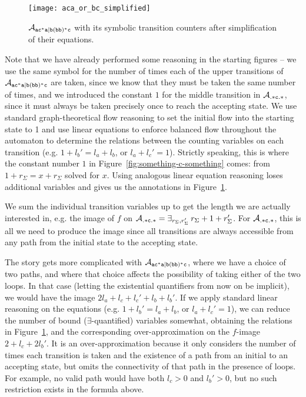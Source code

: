 \documentclass[acmsmall,review,anonymous,screen]{acmart}\settopmatter{printfolios=true,printccs=false,printacmref=true}
\theoremstyle{definition}
\begin{document}
\begin{figure}[h]
  \centering 
    \texttt{[image: aca\_or\_bc\_simplified]}
    \caption{$\mathcal{A}_{\mathtt{ac^*a|b(bb)^*c}}{}$ with its symbolic transition counters after
    simplification of their equations.}\label{fig:example-simplify-1}
  \end{figure}

Note that we have already performed some reasoning in the starting figures -- we
use the same symbol for the number of times each of the upper transitions of
$\mathcal{A}_{\mathtt{ac^*a|b(bb)^*c}}$ are taken, since we know that they must be taken the same number of
times, and we introduced the constant $1$ for the middle transition in
$\mathcal{A}_{\mathtt{.*c.*}}$, since it must always be taken precisely once to reach
the accepting state. We use standard graph-theoretical flow reasoning to set the
initial flow into the starting state to 1 and use linear equations to enforce
balanced flow throughout the automaton to determine the relations between the
counting variables on each transition (e.g. $1 + {l_b}' = l_a + l_b$, or $l_a +
l_c' = 1$). Strictly speaking, this is where the constant number $1$ in
Figure~\ref{fig:something-c-something} comes: from $1 + r_\Sigma = x + r_\Sigma$
solved for $x$. Using analogous linear equation reasoning loses additional
variables and gives us the annotations in Figure~\ref{fig:example-simplify-1}. 

We sum the individual transition variables up to get the length we are actually
interested in, e.g. the image of $f$ on $\mathcal{A}_{\mathtt{.*c.*}} =
\exists_{r_\Sigma, r_\Sigma'} \: r_\Sigma + 1 + r_\Sigma'$. For
$\mathcal{A}_{\mathtt{.*c.*}}{}$, this is all we need to produce the image since all
transitions are always accessible from any path from the initial state to the
accepting state.

The story gets more complicated with $\mathcal{A}_{\mathtt{ac^*a|b(bb)^*c}}{}$, where we have a choice of two
paths, and where that choice affects the possibility of taking either of the two
loops. In that case (letting the existential quantifiers from now on be
implicit), we would have the image $2l_a + l_c + l_c' + l_b + l_b'$. If we apply
standard linear reasoning on the equations (e.g. $1 + {l_b}' = l_a + l_b$, or
$l_a + l_c' = 1$), we can reduce the number of bound ($\exists$-quantified)
variables somewhat, obtaining the relations in
Figure~\ref{fig:example-simplify-1}, and the corresponding over-approximation on
the $f$-image $2 + l_c + 2l_b'$. It is an over-approximation because it only
considers the number of times each transition is taken and the existence of a
path from an initial to an accepting state, but omits the connectivity of that
path in the presence of loops. For example, no valid path would have both $l_c >
0$ and $l_b' > 0$, but no such restriction exists in the formula above.
\end{document}
